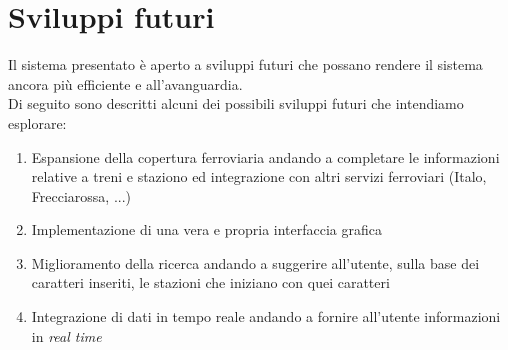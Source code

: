 \documentclass[italian,12pt,a4paper]{article}
\begin{document}
	\section{Sviluppi futuri}
	Il sistema presentato è aperto a sviluppi futuri che possano rendere il sistema ancora più efficiente e all'avanguardia. \\
	Di seguito sono descritti alcuni dei possibili sviluppi futuri che intendiamo esplorare:
	
	\begin{enumerate}
		\item Espansione della copertura ferroviaria andando a completare le informazioni relative a treni e staziono ed integrazione con altri servizi ferroviari (Italo, Frecciarossa, ...)
		\item Implementazione di una vera e propria interfaccia grafica
		\item Miglioramento della ricerca andando a suggerire all'utente, sulla base dei caratteri inseriti, le stazioni che iniziano con quei caratteri
		\item Integrazione di dati in tempo reale andando a fornire all'utente informazioni in \textit{real time}

	\end{enumerate}
	\printbibliography
	
\end{document}
